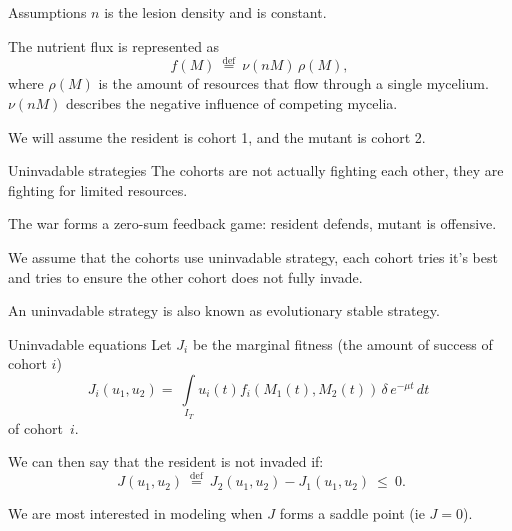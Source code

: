 \documentclass{beamer}
\begin{document}
\begin{frame}{Assumptions}
    $n$ is the lesion density and is constant. \newline
    
    The nutrient flux is represented as
    $$
    f(M) \: \stackrel{\mathrm{def}}{=} \: \nu(n M) \, \rho(M),
    $$
    where $\rho(M)$ is the amount of resources that flow through a single mycelium. $ \nu(n M) $ describes the negative influence of competing mycelia. \newline
    
    We will assume the resident is cohort 1, and the mutant is cohort 2.
\end{frame}

\begin{frame}{Uninvadable strategies}
    The cohorts are not actually fighting each other, they are fighting for limited resources. \newline
    
    The war forms a zero-sum feedback game: resident defends, mutant is offensive. \newline
    
    We assume that the cohorts use uninvadable strategy, each cohort tries it's best and tries to ensure the other cohort does not fully invade. \newline
    
    An uninvadable strategy is also known as evolutionary stable strategy.
\end{frame}


\begin{frame}{Uninvadable equations}
    Let $ J_i $ be the marginal fitness (the amount of success of cohort $i$)
    $$J_i(u_1, u_2) = \: \int\limits_{I_T} u_i(t) f_i(M_1(t), M_2(t)) \, \delta \, e^{-\mu t} \, dt \: $$ of cohort~$ i $. \newline
    
    We can then say that the resident is not invaded if: $$ \: J(u_1, u_2) \: \stackrel{\mathrm{def}}{=} \: J_2(u_1, u_2) - J_1(u_1, u_2) \: \leqslant \: 0. $$ \newline
    
    We are most interested in modeling when $J$ forms a saddle point (ie $J = 0$).
    
\end{frame}
\end{document}
